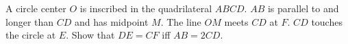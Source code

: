 A circle center $O$ is inscribed in the quadrilateral $ABCD$. $AB$ is parallel to and longer than $CD$ and has midpoint $M$. The line $OM$ meets $CD$ at $F$. $CD$ touches the circle at $E$. Show that $DE = CF$ iff $AB = 2CD$.